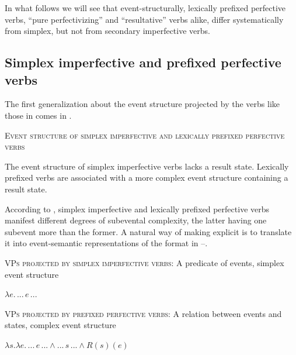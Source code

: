 \documentclass[output=paper,colorlinks,citecolor=brown]{langscibook}
\begin{document}
In what follows we will see that event-structurally, lexically prefixed perfective verbs, “pure perfectivizing” and “resultative” verbs alike, differ systematically from simplex, but not from secondary imperfective verbs. 

\subsection{Simplex imperfective and prefixed perfective verbs}\label{sec:2.1}
\hypertarget{RefHeadingToc164647622}{}
The first generalization about the event structure projected by the verbs like those in  comes in .

\eanoraggedright    \textsc{Event structure of simplex imperfective and lexically prefixed perfective verbs}\label{tat:ex:30}

  The event structure of simplex imperfective verbs lacks a result state. Lexically prefixed verbs are associated with a more complex event structure containing a result state. 
\z 

\noindent According to , simplex imperfective and lexically prefixed perfective verbs manifest different degrees of subevental complexity, the latter having one subevent more than the former. A natural way of making  explicit is to translate it into event-semantic representations of the format in --. 

\eanoraggedright   \textsc{VPs projected by simplex imperfective verbs}: A predicate of events, simplex event structure\label{tat:ex:31}

$\lambda e.\, ...\, e\, ...$
\z

\eanoraggedright   \textsc{VPs projected by prefixed perfective verbs}: A relation between events and states, complex event structure\label{tat:ex:32}

$\lambda s. \lambda e.\, ...\, e\, ... \wedge ...\, s\, ... \wedge R(s)(e)$
\z
\end{document}
